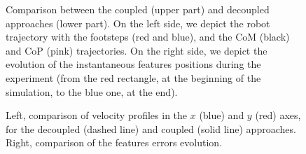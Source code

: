 \begin{figure}[ht]
 \caption{\label{Fig:Comparisons-approaches} Comparison between the coupled (upper part) and decoupled approaches (lower part). On the left side, we depict the robot trajectory with the footsteps (red and blue), and the CoM (black) and CoP (pink) trajectories. On the right side, we depict the evolution of the instantaneous features positions during the experiment (from the red rectangle, at the beginning of the simulation, to the blue one, at the end).}
 \end{figure}

\begin{figure}[ht]
 \centering
 \caption{\label{Fig:Comparisons-velocitieserrors} Left, comparison of velocity profiles in the $x$ (blue) and $y$ (red) axes, for the decoupled (dashed line) and coupled (solid line) approaches. Right, comparison of the features errors evolution.}
 \end{figure}

